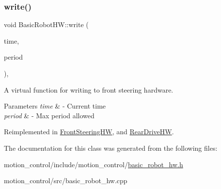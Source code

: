 \mbox{\label{classBasicRobotHW_a62add5eabfca2f88a5035db8b8240bb3}} 
\subsubsection{\texorpdfstring{write()}{write()}}
{\footnotesize\ttfamily void Basic\+Robot\+H\+W\+::write (\begin{DoxyParamCaption}\item[{const ros\+::\+Time \&}]{time,  }\item[{const ros\+::\+Duration \&}]{period }\end{DoxyParamCaption})\hspace{0.3cm}{\ttfamily [override]}, {\ttfamily [virtual]}}



A virtual function for writing to front steering hardware. 


\begin{DoxyParams}{Parameters}
{\em time} & -\/ Current time \\
\hline
{\em period} & -\/ Max period allowed \\
\hline
\end{DoxyParams}


Reimplemented in \hyperlink{classFrontSteeringHW_aa0e57cc4919044aecb7d1c76c8d4ac21}{Front\+Steering\+HW}, and \hyperlink{classRearDriveHW_a36461317b3f595464ef080259bc21fae}{Rear\+Drive\+HW}.



The documentation for this class was generated from the following files\+:\begin{DoxyCompactItemize}
\item 
motion\+\_\+control/include/motion\+\_\+control/\hyperlink{basic__robot__hw_8h}{basic\+\_\+robot\+\_\+hw.\+h}\item 
motion\+\_\+control/src/basic\+\_\+robot\+\_\+hw.\+cpp\end{DoxyCompactItemize}

